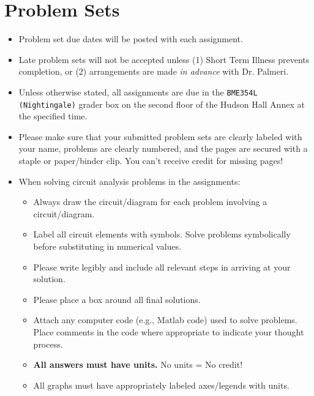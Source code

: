 \section{Problem Sets}
\begin{itemize}
    \item Problem set due dates will be posted with each assignment.  
    \item Late problem sets will not be accepted unless (1) Short Term Illness
        prevents completion, or (2) arrangements are made \emph{in advance}
        with Dr. Palmeri.
    \item Unless otherwise stated, all assignments are due in the \verb+BME354L (Nightingale)+ 
        grader box on the second floor of the Hudson Hall Annex at the
        specified time.  
    \item Please make sure that your submitted problem sets are clearly labeled
        with your name, problems are clearly numbered, and the pages are
        secured with a staple or paper/binder clip.  You can't receive credit
        for missing pages!
    \item When solving circuit analysis problems in the assignments:
        \begin{itemize}
            \item Always draw the circuit/diagram for each problem involving a
                circuit/diagram.
            \item Label all circuit elements with symbols.  Solve problems
                symbolically before substituting in numerical values.
            \item Please write legibly and include all relevant steps in
                arriving at your solution.
            \item Please place a box around all final solutions.
            \item Attach any computer code (e.g., Matlab code) used to solve
                problems.  Place comments in the code where appropriate to
                indicate your thought process.
            \item \textbf{All answers must have units.}  No units = No credit!
            \item All graphs must have appropriately labeled axes/legends with
                units.
        \end{itemize}
\end{itemize}
